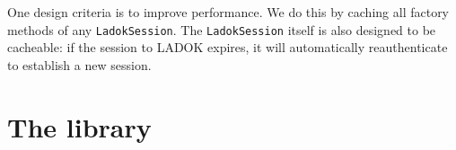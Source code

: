 \documentclass[a4paper,oneside]{book}
\begin{document}
One design criteria is to improve performance.
We do this by caching all factory methods of any \texttt{LadokSession}.
The \texttt{LadokSession} itself is also designed to be cacheable: if the session to 
LADOK expires, it will automatically reauthenticate to establish a new session.



\part{The library}





%
%



\backmatter
\printbibliography
\end{document}

